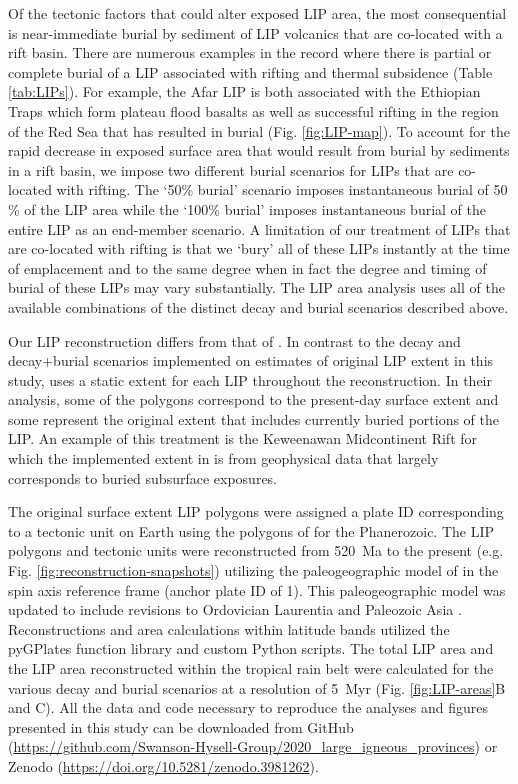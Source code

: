 Of the tectonic factors that could alter exposed LIP area, the most consequential is near-immediate burial by sediment of LIP volcanics that are co-located with a rift basin. There are numerous examples in the record where there is partial or complete burial of a LIP associated with rifting and thermal subsidence (Table \ref{tab:LIPs}). For example, the Afar LIP is both associated with the Ethiopian Traps which form plateau flood basalts as well as successful rifting in the region of the Red Sea that has resulted in burial (Fig. \ref{fig:LIP-map}). To account for the rapid decrease in exposed surface area that would result from burial by sediments in a rift basin, we impose two different burial scenarios for LIPs that are co-located with rifting. The `50\% burial' scenario imposes instantaneous burial of 50$\%$ of the LIP area while the `100\% burial' imposes instantaneous burial of the entire LIP as an end-member scenario. A limitation of our treatment of LIPs that are co-located with rifting is that we `bury' all of these LIPs instantly at the time of emplacement and to the same degree when in fact the degree and timing of burial of these LIPs may vary substantially. The LIP area analysis uses all of the available combinations of the distinct decay and burial scenarios described above.

Our LIP reconstruction differs from that of \citet{Johansson2018a}. In contrast to the decay and decay+burial scenarios implemented on estimates of original LIP extent in this study, \citet{Johansson2018a} uses a static extent for each LIP throughout the reconstruction. In their analysis, some of the polygons correspond to the present-day surface extent and some represent the original extent that includes currently buried portions of the LIP. An example of this treatment is the Keweenawan Midcontinent Rift for which the implemented extent in \citet{Johansson2018a} is from geophysical data that largely corresponds to buried subsurface exposures.

The original surface extent LIP polygons were assigned a plate ID corresponding to a tectonic unit on Earth using the polygons of \citet{Torsvik2016a} for the Phanerozoic. The LIP polygons and tectonic units were reconstructed from 520~Ma to the present (e.g. Fig. \ref{fig:reconstruction-snapshots}) utilizing the paleogeographic model of \citet{Torsvik2016a} in the spin axis reference frame (anchor plate ID of 1). This paleogeographic model was updated to include revisions to Ordovician Laurentia \citep{Swanson-Hysell2017a} and Paleozoic Asia \citep{Domeier2018a}. Reconstructions and area calculations within latitude bands utilized the pyGPlates function library and custom Python scripts. The total LIP area and the LIP area reconstructed within the tropical rain belt were calculated for the various decay and burial scenarios at a resolution of 5~Myr (Fig. \ref{fig:LIP-areas}B and C). All the data and code necessary to reproduce the analyses and figures presented in this study can be downloaded from GitHub (\url{https://github.com/Swanson-Hysell-Group/2020_large_igneous_provinces}) or Zenodo (\url{https://doi.org/10.5281/zenodo.3981262}).

